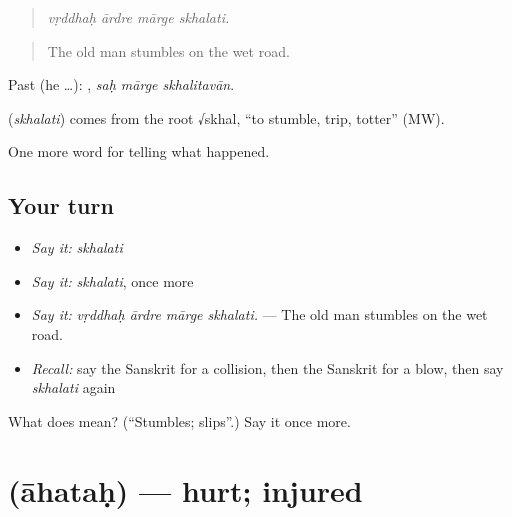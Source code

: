 \begin{quote}
   
\end{quote}

\begin{quote}
\emph{vṛddhaḥ ārdre mārge skhalati.}
\end{quote}

\begin{quote}
The old man stumbles on the wet road.
\end{quote}

Past (he …):   , \emph{saḥ mārge skhalitavān}.

\begin{cousinweb}
\textbf{} (\emph{skhalati}) comes from the root √skhal, \textquotedblleft{}to stumble, trip, totter\textquotedblright{} (MW).
\end{cousinweb}

\begin{grammarlens}[title={What you've built}]
One more word for telling what happened.
\end{grammarlens}

\subsection*{Your turn}
\begin{itemize}
\raggedright
  \item \emph{Say it:} \emph{skhalati}
  \item \emph{Say it:} \emph{skhalati}, once more
  \item \emph{Say it:} \emph{vṛddhaḥ ārdre mārge skhalati.} — The old man stumbles on the wet road.
  \item \emph{Recall:} say the Sanskrit for a collision, then the Sanskrit for a blow, then say \emph{skhalati} again
\end{itemize}

\begin{tcolorbox}[breakable,colback=teal!4,colframe=teal!35!black,title={Before you move on}]
What does  mean? (\textquotedblleft{}Stumbles; slips\textquotedblright{}.) Say it once more.
\end{tcolorbox}
\section[\texorpdfstring{\sk{आहतः} (āhataḥ)}{आहतः (āhataḥ)}]{ (āhataḥ) — hurt; injured}

